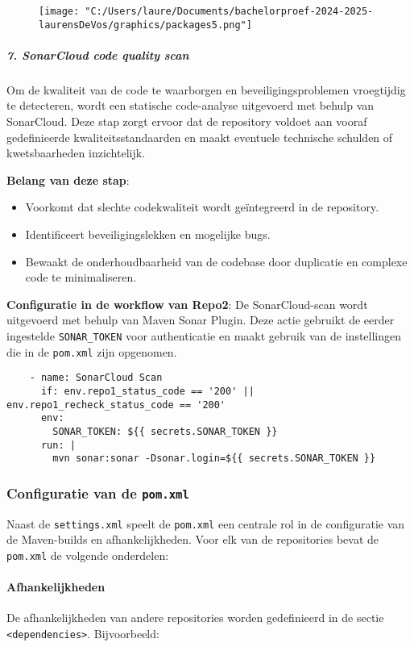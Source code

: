 \begin{figure}[h!]
    \centering
    \texttt{[image: "C:/Users/laure/Documents/bachelorproef-2024-2025-laurensDeVos/graphics/packages5.png"]}
    \label{fig:packages5}
\end{figure}

\subparagraph{7. SonarCloud code quality scan}
Om de kwaliteit van de code te waarborgen en beveiligingsproblemen vroegtijdig te detecteren, wordt een statische code-analyse uitgevoerd met behulp van SonarCloud. Deze stap zorgt ervoor dat de repository voldoet aan vooraf gedefinieerde kwaliteitsstandaarden en maakt eventuele technische schulden of kwetsbaarheden inzichtelijk.

\textbf{Belang van deze stap}:
\begin{itemize}
    \item Voorkomt dat slechte codekwaliteit wordt geïntegreerd in de repository.
    \item Identificeert beveiligingslekken en mogelijke bugs.
    \item Bewaakt de onderhoudbaarheid van de codebase door duplicatie en complexe code te minimaliseren.
\end{itemize}

\textbf{Configuratie in de workflow van Repo2}:
De SonarCloud-scan wordt uitgevoerd met behulp van Maven Sonar Plugin. Deze actie gebruikt de eerder ingestelde \texttt{SONAR\_TOKEN} voor authenticatie en maakt gebruik van de instellingen die in de \texttt{pom.xml} zijn opgenomen.

\begin{verbatim}
    - name: SonarCloud Scan
      if: env.repo1_status_code == '200' || env.repo1_recheck_status_code == '200'
      env:
        SONAR_TOKEN: ${{ secrets.SONAR_TOKEN }}
      run: |
        mvn sonar:sonar -Dsonar.login=${{ secrets.SONAR_TOKEN }}
\end{verbatim}

\subsubsection{Configuratie van de \texttt{pom.xml}}
Naast de \texttt{settings.xml} speelt de \texttt{pom.xml} een centrale rol in de configuratie van de Maven-builds en afhankelijkheden. Voor elk van de repositories bevat de \texttt{pom.xml} de volgende onderdelen:

\paragraph{Afhankelijkheden}
De afhankelijkheden van andere repositories worden gedefinieerd in de sectie \texttt{<dependencies>}. Bijvoorbeeld:

